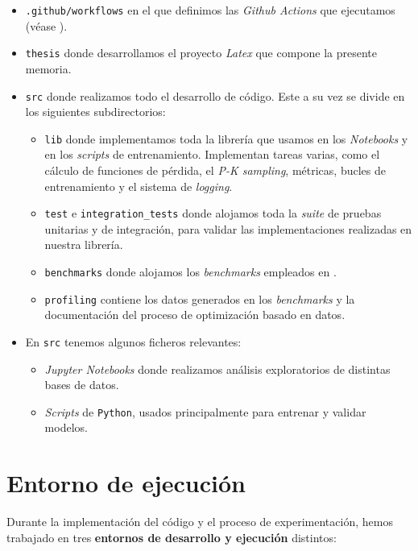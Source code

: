 \begin{itemize}
	\item \lstinline{.github/workflows} en el que definimos las \textit{Github Actions} que ejecutamos (véase ).
	\item \lstinline{thesis} donde desarrollamos el proyecto \textit{Latex} que compone la presente memoria.
	\item \lstinline{src} donde realizamos todo el desarrollo de código. Este a su vez se divide en los siguientes subdirectorios:
	      \begin{itemize}
		      \item \lstinline{lib} donde implementamos toda la librería que usamos en los \textit{Notebooks} y en los \textit{scripts} de entrenamiento. Implementan tareas varias, como el cálculo de funciones de pérdida, el \textit{P-K sampling}, métricas, bucles de entrenamiento y el sistema de \textit{logging}.
		      \item \lstinline{test} e \lstinline{integration_tests} donde alojamos toda la \textit{suite} de pruebas unitarias y de integración, para validar las implementaciones realizadas en nuestra librería.
		      \item \lstinline{benchmarks} donde alojamos los \textit{benchmarks} empleados en .
		      \item \lstinline{profiling} contiene los datos generados en los \textit{benchmarks} y la documentación del proceso de optimización basado en datos.
	      \end{itemize}
	\item En \lstinline{src} tenemos algunos ficheros relevantes:

	      \begin{itemize}
		      \item \textit{Jupyter Notebooks} donde realizamos análisis exploratorios de distintas bases de datos.
		      \item \textit{Scripts} de \lstinline{Python}, usados principalmente para entrenar y validar modelos.
	      \end{itemize}\end{itemize}

\section{Entorno de ejecución} \label{isec:entorno_ejecucion}

Durante la implementación del código y el proceso de experimentación, hemos trabajado en tres \textbf{entornos de desarrollo y ejecución} distintos:


